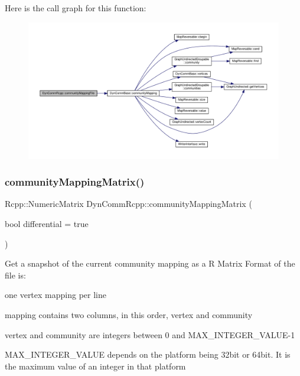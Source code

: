 Here is the call graph for this function\+:
\nopagebreak
\begin{figure}[H]
\begin{center}
\leavevmode
\includegraphics[width=350pt]{classDynCommRcpp_a132aff4ca6f76fd006b2faccbfd01e04_cgraph}
\end{center}
\end{figure}
\mbox{\label{classDynCommRcpp_aaa996ab5e558887d3bc5394af78a2e95}} 
\subsubsection{\texorpdfstring{community\+Mapping\+Matrix()}{communityMappingMatrix()}}
{\footnotesize\ttfamily Rcpp\+::\+Numeric\+Matrix Dyn\+Comm\+Rcpp\+::community\+Mapping\+Matrix (\begin{DoxyParamCaption}\item[{bool}]{differential = {\ttfamily true} }\end{DoxyParamCaption})\hspace{0.3cm}{\ttfamily [inline]}}

Get a snapshot of the current community mapping as a R Matrix Format of the file is\+:
\begin{DoxyItemize}
\item one vertex mapping per line
\item mapping contains two columns, in this order, vertex and community
\item vertex and community are integers between 0 and M\+A\+X\+\_\+\+I\+N\+T\+E\+G\+E\+R\+\_\+\+V\+A\+L\+U\+E-\/1
\item M\+A\+X\+\_\+\+I\+N\+T\+E\+G\+E\+R\+\_\+\+V\+A\+L\+UE depends on the platform being 32bit or 64bit. It is the maximum value of an integer in that platform 
\end{DoxyItemize}

